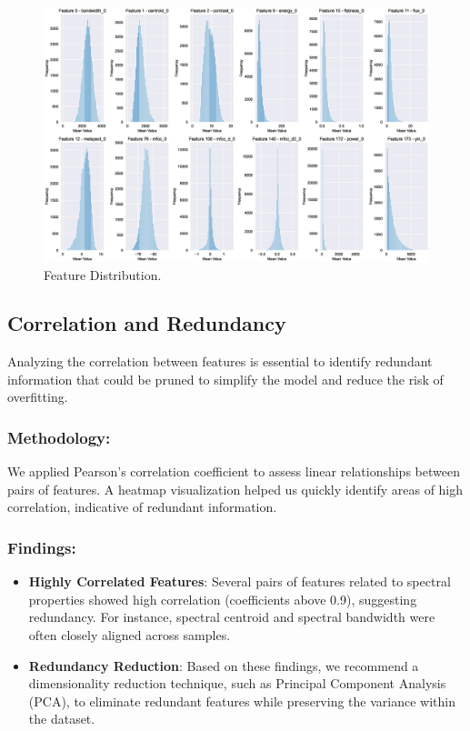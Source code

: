 \begin{figure}[!ht]
	\centering
	\includegraphics[scale=0.3]{fig/feature_dist}
	\vspace{-0.3cm}
	\caption{Feature Distribution.}
	\label{fig:FeatureDistribution}
	\vspace{-0.1cm}
\end{figure}


\subsection{Correlation and Redundancy}

Analyzing the correlation between features is essential to identify redundant information that could be pruned to simplify the model and reduce the risk of overfitting.

\subsubsection{Methodology:}

We applied Pearson's correlation coefficient to assess linear relationships between pairs of features. A heatmap visualization helped us quickly identify areas of high correlation, indicative of redundant information.

\subsubsection{Findings:}

\begin{itemize}
    \item \textbf{Highly Correlated Features}: Several pairs of features related to spectral properties showed high correlation (coefficients above 0.9), suggesting redundancy. For instance, spectral centroid and spectral bandwidth were often closely aligned across samples.
    \item \textbf{Redundancy Reduction}: Based on these findings, we recommend a dimensionality reduction technique, such as Principal Component Analysis (PCA), to eliminate redundant features while preserving the variance within the dataset.
\end{itemize}

